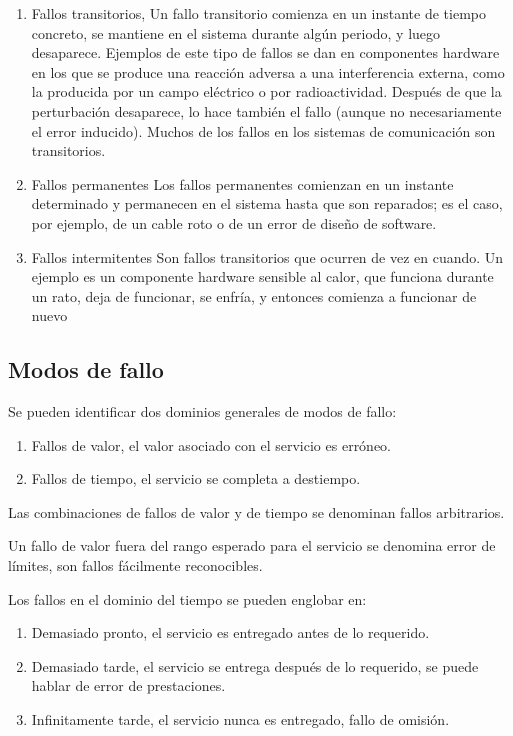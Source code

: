 \begin{enumerate}
	\item Fallos transitorios, Un fallo transitorio comienza en un instante
		de tiempo concreto, se mantiene en el sistema durante algún
		periodo, y luego desaparece. Ejemplos de este tipo de fallos se
		dan en componentes hardware en los que se produce una reacción
		adversa a una interferencia externa, como la producida por un
		campo eléctrico o por radioactividad. Después de que la
		perturbación desaparece, lo hace también el fallo (aunque no
		necesariamente el error inducido). Muchos de los fallos en los
		sistemas de comunicación son transitorios.
	\item Fallos permanentes Los fallos permanentes comienzan en un instante
		determinado y permanecen en el sistema hasta que son reparados;
		es el caso, por ejemplo, de un cable roto o de un error de
		diseño de software.
	\item Fallos intermitentes Son fallos transitorios que ocurren de vez en
		cuando. Un ejemplo es un componente hardware sensible al calor,
		que funciona durante un rato, deja de funcionar, se enfría, y
		entonces comienza a funcionar de nuevo
\end{enumerate}

\subsection{Modos de fallo}

Se pueden identificar dos dominios generales de modos de fallo:

\begin{enumerate}
	\item Fallos de valor, el valor asociado con el servicio es erróneo.
	\item Fallos de tiempo, el servicio se completa a destiempo.
\end{enumerate}

Las combinaciones de fallos de valor y de tiempo se denominan fallos
arbitrarios.

Un fallo de valor fuera del rango esperado para el servicio se denomina error de
límites, son fallos fácilmente reconocibles.

Los fallos en el dominio del tiempo se pueden englobar en:

\begin{enumerate}
	\item Demasiado pronto, el servicio es entregado antes de lo requerido.
	\item Demasiado tarde, el servicio se entrega después de lo requerido,
		se puede hablar de error de prestaciones.
	\item Infinitamente tarde, el servicio nunca es entregado, fallo de
		omisión.
\end{enumerate}

